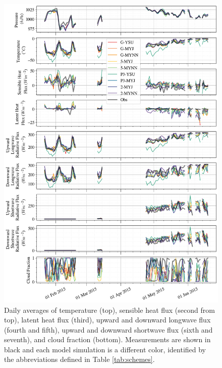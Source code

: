 \begin{figure}[p!]
    \centering
        \vspace*{-1cm}
    \includegraphics[width=1\linewidth]{figures/chapter3/WRF_totaltimeseries.png}
    \caption[Polar WRF simulated temperature, pressure, sensible and latent heat flux, components of longwave and shortwave flux, and cloud fraction time series.]{Daily averages of temperature (top), sensible heat flux (second from top), latent heat flux (third), upward and downward longwave flux (fourth and fifth), upward and downward shortwave flux (sixth and seventh), and cloud fraction (bottom). Measurements are shown in black and each model simulation is a different color, identified by the abbreviations defined in Table \ref{tab:schemes}.}
    \label{fig:wrf_all}
\end{figure}

